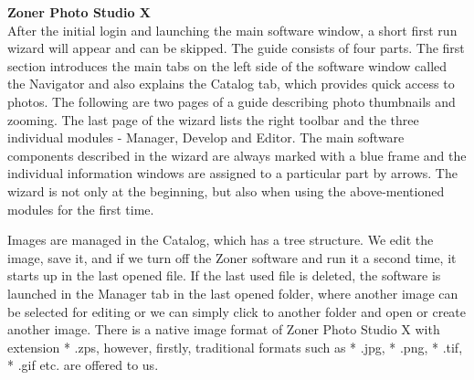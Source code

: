 \documentclass[a4paper,10pt,twoside]{article}
\begin{document}
\noindent \textbf{Zoner Photo Studio X} \\

\noindent After the initial login and launching the main software window, a short first run wizard will appear and can be skipped. The guide consists of four parts. The first section introduces the main tabs on the left side of the software window called the Navigator and also explains the Catalog tab, which provides quick access to photos. The following are two pages of a guide describing photo thumbnails and zooming. The last page of the wizard lists the right toolbar and the three individual modules - Manager, Develop and Editor. The main software components described in the wizard are always marked with a blue frame and the individual information windows are assigned to a particular part by arrows. The wizard is not only at the beginning, but also when using the above-mentioned modules for the first time.

Images are managed in the Catalog, which has a tree structure. We edit the image, save it, and if we turn off the Zoner software and run it a second time, it starts up in the last opened file. If the last used file is deleted, the software is launched in the Manager tab in the last opened folder, where another image can be selected for editing or we can simply click to another folder and open or create another image. There is a native image format of Zoner Photo Studio X with extension * .zps, however, firstly, traditional formats such as * .jpg, * .png, * .tif, * .gif etc. are offered to us.
\end{document}
